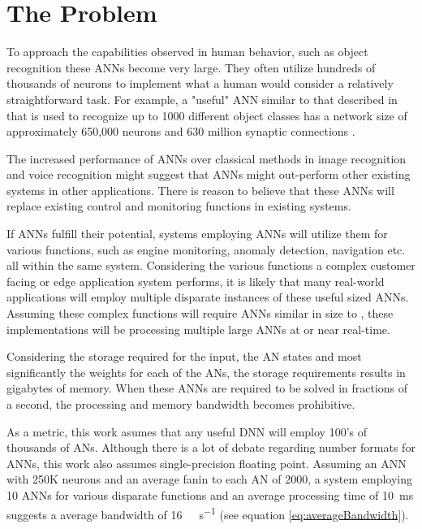 \section[The Problem]{The Problem}
\label{sec:The Problem}

To approach the capabilities observed in human behavior, such as object recognition these ANNs become very large.
They often utilize hundreds of thousands of neurons to implement what a human would consider a relatively straightforward task.
For example, a "useful" ANN similar to that described in \cite{krizhevsky2012imagenet} that is used to recognize up to 1000 different object classes has a network size of approximately 650,000 neurons and 630 million synaptic connections \cite{krizhevsky2012imagenetPreso}. 

The increased performance of ANNs over classical methods in image recognition and voice recognition might suggest that ANNs might out-perform other existing systems in other applications.
There is reason to believe that these ANNs will replace existing control and monitoring functions in existing systems.

If ANNs fulfill their potential, systems employing ANNs will utilize them for various functions, such as engine monitoring, anomaly detection, navigation etc. all within the same system.
Considering the various functions a complex customer facing or edge application system performs, it is likely that many real-world applications will employ multiple disparate instances of these useful sized ANNs.
Assuming these complex functions will require ANNs similar in size to \cite{krizhevsky2012imagenet}, these implementations will be processing multiple large ANNs at or near real-time.

Considering the storage required for the input, the AN states and most significantly the weights for each of the ANs, the storage requirements results in gigabytes of memory.
When these ANNs are required to be solved in fractions of a second, the processing and memory bandwidth becomes prohibitive.

As a metric, this work asumes that any useful DNN will employ 100's of thousands of ANs. Although there is a lot of debate regarding number formats for ANNs, this work also assumes single-precision floating point.
Assuming an ANN with 250K neurons and an average fanin to each AN of 2000, a system employing 10 ANNs for various disparate functions and an average processing time of \SI{10}{\milli\second} suggests a average bandwidth of \SI[per-mode=symbol]{16}{\tera \bit \per \second} (see equation \ref{eq:averageBandwidth}).

